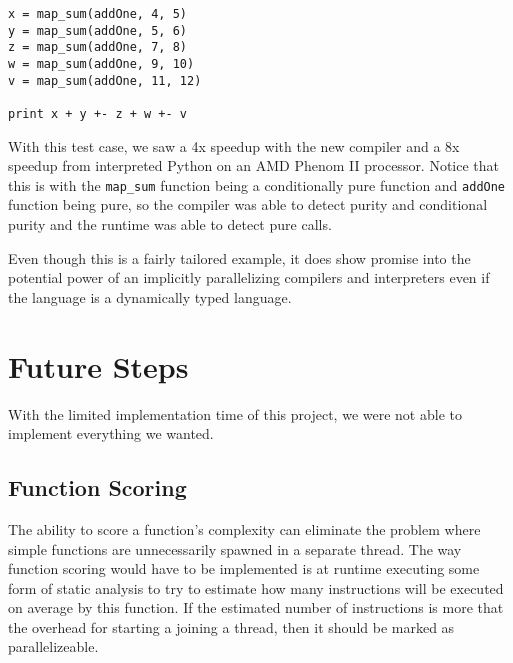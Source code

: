 \documentclass{acm_proc_article-sp}
\begin{document}
\begin{verbatim}
x = map_sum(addOne, 4, 5)                                                                                                                                                                                           
y = map_sum(addOne, 5, 6)                                                                                                                                                                                           
z = map_sum(addOne, 7, 8)                                                                                                                                                                                           
w = map_sum(addOne, 9, 10)                                                                                                                                                                                          
v = map_sum(addOne, 11, 12)                                                                                                                                                                                         
                                                                                                                                                                                                                    
print x + y +- z + w +- v
\end{verbatim}

With this test case, we saw a 4x speedup with the new compiler and a 8x
speedup from interpreted Python on an AMD Phenom II processor. Notice that
this is with the \verb|map_sum| function being a conditionally pure function
and \verb|addOne| function being pure, so the compiler was able to detect purity
and conditional purity and the runtime was able to detect pure calls.

Even though this is a fairly tailored example, it does show promise into the potential
power of an implicitly parallelizing compilers and interpreters even if the language
is a dynamically typed language. 

\section*{Future Steps}
With the limited implementation time of this project, we were not able to implement everything
we wanted.

\subsection*{Function Scoring}
The ability to score a function's complexity can eliminate the problem where
simple functions are unnecessarily spawned in a separate thread. The way function
scoring would have to be implemented is at runtime executing some form of static
analysis to try to estimate how many instructions will be executed on average by
this function. If the estimated number of instructions is more that the overhead
for starting a joining a thread, then it should be marked as parallelizeable.
\end{document}
